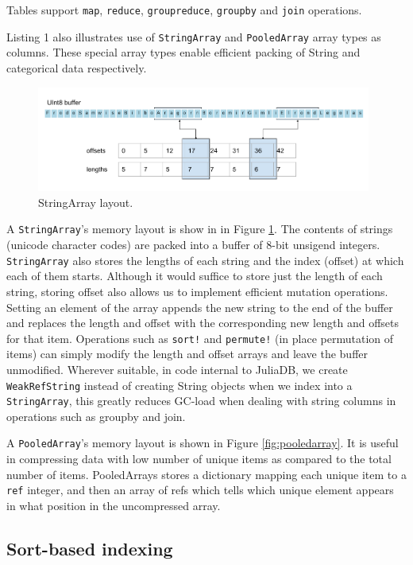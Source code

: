 \documentclass{juliacon}
\begin{document}
Tables support \texttt{map}, \texttt{reduce}, \texttt{groupreduce}, \texttt{groupby} and \texttt{join} operations.

Listing 1 also illustrates use of \texttt{StringArray} and \texttt{PooledArray} array types as columns. These special array types enable efficient packing of String and categorical data respectively.


\begin{figure}[t]
\centerline{\includegraphics[width=11cm]{stringarray.png}}
\caption{StringArray layout.}
  \label{fig:stringarray}
\end{figure}

A \texttt{StringArray}'s memory layout is show in in Figure \ref{fig:stringarray}. The contents of strings (unicode character codes) are packed into a buffer of 8-bit unsigend integers. \texttt{StringArray} also stores the lengths of each string and the index (offset) at which each of them starts. Although it would suffice to store just the length of each string, storing offset also allows us to implement efficient mutation operations. Setting an element of the array appends the new string to the end of the buffer and replaces the length and offset with the corresponding new length and offsets for that item. Operations such as \texttt{sort!} and \texttt{permute!} (in place permutation of items) can simply modify the length and offset arrays and leave the buffer unmodified. Wherever suitable, in code internal to JuliaDB, we create \texttt{WeakRefString} instead of creating String objects when we index into a \texttt{StringArray}, this greatly reduces GC-load when dealing with string columns in operations such as groupby and join.

A \texttt{PooledArray}'s memory layout is shown in Figure \ref{fig:pooledarray}. It is useful in compressing data with low number of unique items as compared to the total number of items. PooledArrays stores a dictionary mapping each unique item to a \texttt{ref} integer, and then an array of refs which tells which unique element appears in what position in the uncompressed array.

\subsection{Sort-based indexing}
\end{document}
